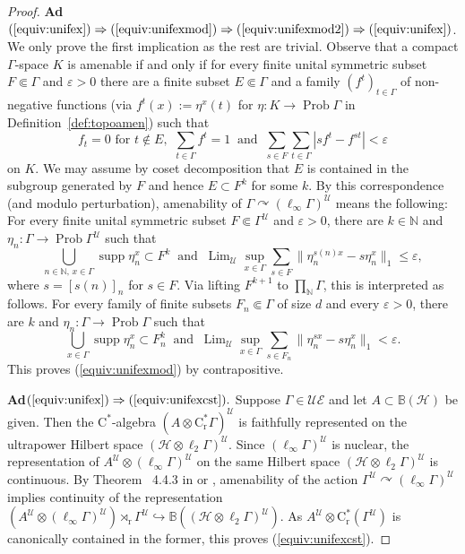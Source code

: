 \documentclass[12pt,nosumlimits,nonamelimits]{amsart}
\theoremstyle{remark}
\theoremstyle{definition}
\newcommand{\IB}{\mathbb{B}}
\newcommand{\IN}{\mathbb{N}}
\newcommand{\rC}{\mathrm{C}}
\newcommand{\rr}{\mathrm{r}}
\newcommand{\cH}{\mathcal{H}}
\newcommand{\cU}{\mathcal{U}}
\newcommand{\ve}{\varepsilon}
\newcommand{\Ga}{\Gamma}
\newcommand{\acts}{\curvearrowright}
\newcommand{\UE}{\mathcal{UE}}
\DeclareMathOperator{\Prob}{Prob}
\DeclareMathOperator{\Lim}{Lim}
\DeclareMathOperator{\supp}{supp}
\newcommand{\cst}{$\rC^*$-alge\-bra}
\begin{document}
\begin{proof}
\textbf{Ad}$(\ref{equiv:unifex})\Rightarrow(\ref{equiv:unifexmod})\Rightarrow(\ref{equiv:unifexmod2})\Rightarrow(\ref{equiv:unifex})$. 
We only prove the first implication as the rest are trivial. 
Observe that a compact $\Ga$-space $K$ is amenable 
if and only if for every finite unital symmetric subset $F\Subset\Ga$ 
and $\ve>0$ there are a finite subset $E\Subset\Ga$ and 
a family $(f^t)_{t\in \Ga}$ of non-negative functions 
(via $f^t(x) := \eta^x(t)$ for $\eta\colon K\to\Prob \Ga$ 
in Definition~\ref{def:topoamen}) such that 
\[
f_t=0
\mbox{ for $t\notin E$, }\ 
\sum_{t\in\Ga} f^t =1 
\ \mbox{ and }\ 
\sum_{s\in F}\sum_{t\in \Ga} |sf^t-f^{st}|<\ve
\] 
on $K$. 
We may assume by coset decomposition that 
$E$ is contained in the subgroup generated by $F$ 
and hence $E\subset F^k$ for some $k$.
By this correspondence (and modulo perturbation), 
amenability of $\Ga\acts(\ell_\infty\Ga)^\cU$ means the following: 
For every finite unital symmetric subset $F\Subset \Ga^\cU$ 
and $\ve>0$, there are $k\in\IN$ and 
$\eta_n\colon \Ga\to \Prob \Ga^\cU$ such that 
\[
\bigcup_{n\in\IN,\,x\in\Ga} \supp\eta_n^x \subset F^k
\ \mbox{ and }\ 
\Lim_\cU\sup_{x\in \Ga} \sum_{s\in F}\|\eta_n^{s(n) x} - s\eta_n^x\|_1 \le \ve, 
\]
where $s=[s(n)]_n$ for $s\in F$. 
Via lifting $F^{k+1}$ to $\prod_\IN\Ga$, this is interpreted as follows. 
For every family of finite subsets $F_n\Subset\Ga$ 
of size $d$ and every $\ve>0$, 
there are $k$ and $\eta_n\colon \Ga\to\Prob \Ga$ 
such that 
\[
\bigcup_{x\in\Ga} \supp\eta_n^x\subset F_n^k
\ \mbox{ and }\ 
\Lim_\cU \sup_{x\in \Ga}\sum_{s\in F_n}\|\eta_n^{s x} -s\eta_n^x\|_1 < \ve.
\]
This proves (\ref{equiv:unifexmod}) by contrapositive. 

\textbf{Ad}$(\ref{equiv:unifex})\Rightarrow(\ref{equiv:unifexcst}).$ 
Suppose $\Ga\in\UE$ and let $A\subset\IB(\cH)$ be given.  
Then the \cst{} $(A\otimes \rC^*_{\rr}\Ga)^\cU$ 
is faithfully represented on the ultrapower Hilbert space
$(\cH\otimes\ell_2\Ga)^\cU$. 
Since $(\ell_\infty\Ga)^\cU$ is nuclear, 
the representation of 
$A^\cU\otimes(\ell_\infty\Ga)^\cU$ on 
the same Hilbert space $(\cH\otimes\ell_2\Ga)^\cU$ 
is continuous. 
By Theorem~ 4.4.3 in \cite{bo} 
or \cite{anantharaman-delaroche,adr}, 
amenability of the action $\Ga^\cU\acts(\ell_\infty\Ga)^\cU$ 
implies continuity of the representation
$(A^\cU\otimes(\ell_\infty\Ga)^\cU)\rtimes_{\rr}\Ga^\cU 
\hookrightarrow \IB((\cH\otimes\ell_2\Ga)^\cU)$. 
As $A^\cU \otimes \rC^*_{\rr}(\Ga^\cU)$ is 
canonically contained in the former, 
this proves (\ref{equiv:unifexcst}). 


\end{proof}
\end{document}
